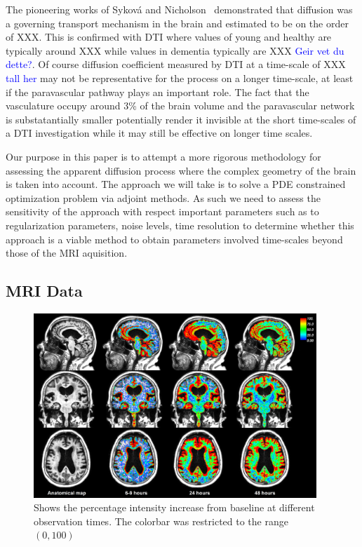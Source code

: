 \documentclass[11pt,a4paper]{article}
\newcommand{\kam}[1]{\textcolor{blue}{#1}}
\begin{document}
The pioneering works of Sykov{\'a} and Nicholson~\cite{sykova2008diffusion} demonstrated
that diffusion was a governing transport mechanism in the brain and estimated to be on the order
of XXX. This is confirmed with DTI where values of young and healthy are typically around XXX
while values in dementia typically are XXX \kam{Geir vet du dette?}. Of course diffusion coefficient 
measured by DTI at a time-scale of XXX \kam{tall her} may not be representative for the process on a
longer time-scale, at least if the paravascular pathway plays an important role. The fact that the vasculature  occupy around 3\% of the brain volume 
and the paravascular network is substatantially smaller potentially render it invisible at the short time-scales of a DTI investigation 
while it may still be effective on longer time scales.   


Our purpose in this paper is to attempt a more rigorous methodology 
for assessing the apparent diffusion process where
the complex geometry of the brain is taken into account. The approach 
we will take is to solve a PDE constrained optimization problem 
via adjoint methods. As such we need to assess the sensitivity of
the approach with respect important parameters such as to regularization parameters, noise levels, 
time resolution to determine whether this approach is a viable method
to obtain parameters involved time-scales beyond those of the MRI aquisition.     



\subsection*{MRI Data}
\begin{figure}
\includegraphics[width=0.95\textwidth]{PatID-68-new-100.png} 
\caption{Shows the percentage intensity increase from baseline at different observation times. The colorbar was restricted to the range $(0,100)$ }
\label{fig1} 
\end{figure}
\end{document}
